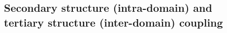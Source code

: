 \documentclass[journal=jacsat,manuscript=article]{achemso}
\begin{document}
\subsection{Secondary structure (intra-domain) and tertiary structure (inter-domain) coupling} 

\end{document}
